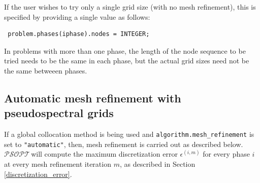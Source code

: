 \documentclass[a4paper,11pt]{report}    %
\newcommand{\psopt}{$\mathcal{PSOPT}$\,}  %
\begin{document}
If the user wishes to try only a single grid size (with no mesh refinement), this
is specified by providing a single value as follows:

\begin{verbatim}
 problem.phases(iphase).nodes = INTEGER;
\end{verbatim}

In problems with more than one phase, the length of the node sequence to be tried
needs to be the same in each phase, but the actual grid sizes need not be the same
betweeen phases.


\subsection{Automatic mesh refinement with pseudospectral grids}

If a global collocation method is being used and \verb|algorithm.mesh_refinement| is set to \verb|"automatic"|,
then, mesh refinement is carried out as described below. \psopt will compute the maximum discretization error
$\epsilon^{(i,m)}$ for every phase $i$  at every mesh refinement iteration $m$, as described in Section \ref{discretization_error}.
\end{document}

